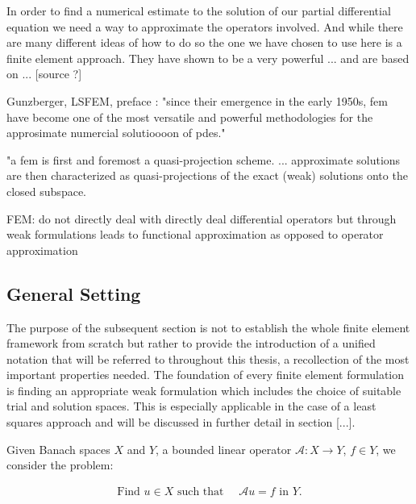 \documentclass[../draft_1.tex]{subfiles}
\begin{document}
In order to find a numerical estimate to the solution of our partial differential equation we need a way to approximate the operators involved. And while there are many different ideas of how to do so the one we have chosen to use here is a finite element approach. They have shown to be a very powerful ... and are based on ... [source ?] 

Gunzberger, LSFEM, preface : "since their emergence in the early 1950s, fem have become one of the most versatile and powerful methodologies for the approsimate numercial solutioooon of pdes."

"a fem is first and foremost a quasi-projection scheme. ... approximate solutions are then characterized as quasi-projections of the exact (weak) solutions onto the closed subspace.

FEM: do not directly deal with directly deal differential operators but through weak formulations leads to functional approximation as opposed to operator approximation

\subsection{General Setting}

The purpose of the subsequent section is not to establish the whole finite element framework from scratch but rather to provide the introduction of a unified notation that will be referred to throughout this thesis, a recollection of the most important properties needed. The foundation of every finite element formulation is finding an appropriate weak formulation which includes the choice of suitable trial and solution spaces. This is especially applicable in the case of a least squares approach and will be discussed in further detail in section [...]. 

Given Banach spaces $X$ and $Y$, a bounded linear operator $\mathcal{A} : X \rightarrow Y$, $f \in Y$, we consider the problem:
\begin{ceqn}
\begin{align}
\text{Find } u \in X \text{ such that } \quad \mathcal{A} u = f \text{ in } Y.
\end{align}
\end{ceqn}
\end{document}

